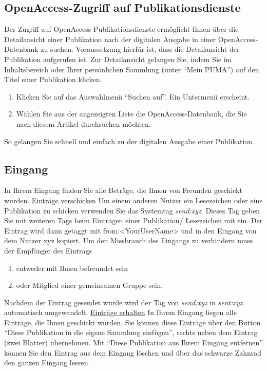\subsection{OpenAccess-Zugriff auf Publikationsdienste}%
Der Zugriff auf OpenAccess Publikationsdienste ermöglicht Ihnen über die Detailansicht einer Publikation nach der digitalen Ausgabe in einer OpenAccess-Datenbank zu suchen. Voraussetzung hierfür ist, dass die Detailansicht der Publikation aufgerufen ist. Zur Detailansicht gelangen Sie, indem Sie im Inhaltsbereich oder Ihrer persönlichen Sammlung (unter \enquote{Mein PUMA}) auf den Titel einer Publikation klicken. 
\begin{enumerate}
    \item Klicken Sie auf das Auswahlmenü \enquote{Suchen auf}. Ein Untermenü erscheint.
    \item Wählen Sie aus der angezeigten Liste die OpenAccess-Datenbank, die Sie nach diesem Artikel durchsuchen möchten. 
\end{enumerate}
 So gelangen Sie schnell und einfach zu der digitalen Ausgabe einer Publikation. 
\subsection{Eingang}
In Ihrem Eingang finden Sie alle Beträge, die Ihnen von Freunden geschickt wurden.
\newline
\newline
\underline{Einträge verschicken}
\newline
Um einem anderen Nutzer ein Lesezeichen oder eine Publikation zu schicken verwenden Sie das Systemtag \textit{send:xyz}. Dieses Tag geben Sie mit weiteren Tags beim Eintragen einer Publikation/ Lesezeichen mit ein. Der Eintrag wird dann getaggt mit from:<YourUserName> und in den Eingang von dem Nutzer xyz kopiert. Um den Missbrauch des Eingangs zu verhindern muss der Empfänger des Eintrags
\begin{enumerate}
    \item entweder mit Ihnen befreundet sein
    \item oder Mitglied einer gemeinsamen Gruppe sein.
\end{enumerate}
Nachdem der Eintrag gesendet wurde wird der Tag von \textit{send:xyz} in \textit{sent:xyz} automatisch umgewandelt.
\newline
\newline
\underline{Einträge erhalten}
\newline
In Ihrem Eingang liegen alle Einträge, die Ihnen geschickt wurden. Sie können diese Einträge über den Button \enquote{Diese Publikation in die eigene Sammlung einfügen}, rechts neben dem Eintrag (zwei Blätter) übernehmen. Mit \enquote{Diese Publikation aus Ihrem Eingang entfernen} können Sie den Eintrag aus dem Eingang löschen und über das schwarze Zahnrad den ganzen Eingang leeren.
\newpage
